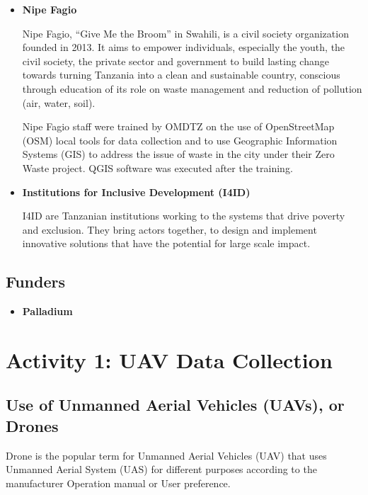 \documentclass[a4paper,12pt,twoside]{article}
\begin{document}
    \begin{itemize}
        \item \textbf{Nipe Fagio}
    
        Nipe Fagio, “Give Me the Broom” in Swahili, is a civil society organization founded in 2013. It aims to empower individuals, especially the youth, the civil society, the private sector and government to build lasting change towards turning Tanzania into a clean and sustainable country, conscious through education of its role on waste management and reduction of pollution (air, water, soil).
    
        Nipe Fagio staff were trained by OMDTZ on the use of OpenStreetMap (OSM) local tools for data collection and to use Geographic Information Systems (GIS) to address the issue of waste in the city under their Zero Waste project. QGIS software was executed after the training.

        \item \textbf{Institutions for Inclusive Development (I4ID)}
    
        I4ID are Tanzanian institutions working to the systems that drive poverty and exclusion. They bring actors together, to design and implement innovative solutions that have the potential for large scale impact.
    
    \end{itemize}

\subsection{Funders}

    \begin{itemize}
        \item \textbf{Palladium}
    
        \lipsum[0-1]
    
    \end{itemize}   

\section{Activity 1: UAV Data Collection}

\subsection{Use of Unmanned Aerial Vehicles (UAVs), or Drones}

Drone is the popular term for Unmanned Aerial Vehicles (UAV) that uses Unmanned Aerial System (UAS) for different purposes according to the manufacturer Operation manual or User preference. 
\end{document}
